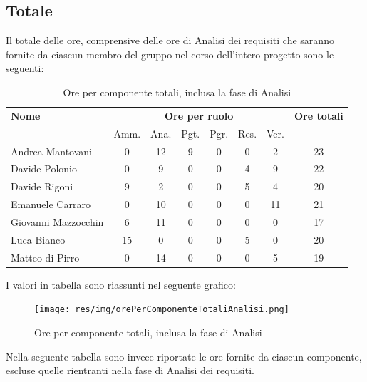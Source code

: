 \subsection{Totale}
Il totale delle ore, comprensive delle ore di Analisi dei requisiti che saranno fornite da ciascun membro
del gruppo nel corso dell’intero progetto sono le seguenti:

\begin{table}[H]
\begin{tabular}{lccccccc}
\toprule
    \textbf{Nome}  & \multicolumn{6}{c}{\textbf{Ore per ruolo}} & \textbf{Ore totali} \\
     & Amm. & Ana. & Pgt. & Pgr. & Res. & Ver. & \\
    \midrule
    
	Andrea Mantovani & 0 & 12 & 9 & 0 & 0 & 2 & 23 \\
	Davide Polonio & 0 & 9 & 0 & 0 & 4 & 9 & 22 \\
	Davide Rigoni & 9 & 2 & 0 & 0 & 5 & 4 & 20 \\
	Emanuele Carraro & 0 & 10 & 0 & 0 & 0 & 11 & 21 \\
	Giovanni Mazzocchin & 6 & 11 & 0 & 0 & 0 & 0 & 17 \\
	Luca Bianco & 15 & 0 & 0 & 0 & 5 & 0 & 20 \\
	Matteo di Pirro & 0 & 14 & 0 & 0 & 0 & 5 & 19 \\
    
    \bottomrule
\end{tabular}
\caption{Ore per componente totali, inclusa la fase di Analisi}
\end{table}

I valori in tabella sono riassunti nel seguente grafico: \\ 

    \begin{figure}[H]
      \begin{center}
        \texttt{[image: res/img/orePerComponenteTotaliAnalisi.png]}
      \caption{Ore per componente totali, inclusa la fase di Analisi}
      \end{center} 
    \end{figure}    
    
Nella seguente tabella sono invece riportate le ore fornite da ciascun componente, escluse quelle rientranti nella fase di Analisi dei requisiti.

